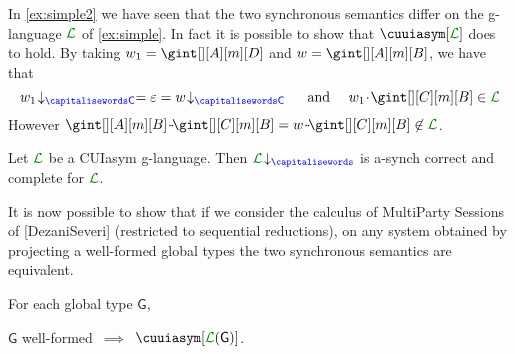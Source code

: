 %
%
% 
% 
%

\begin{example}
In \cref{ex:simple2} we have seen that the two synchronous semantics differ on the g-language 
$\clang$ of \cref{ex:simple}.
In fact it is possible to show that $\cuuiasym[{\clang}]$ does to hold.
By taking $\acword_1=\gint[][A][m][D]$ and $\acword=\gint[][A][m][B]$, we have that
$$\proj{\acword_1}{C}=\emptyword = \proj{\acword}{C} \quad\text{ and }\quad \acword_1\cat\gint[][C][m][B]\in\clang$$
However $\gint[][A][m][B]\cat\cat\gint[][C][m][B]= \acword\cat\cat\gint[][C][m][B]\not\in\clang$.
\finex
\end{example}


\begin{corollary}
Let $\clang$ be a CUIasym g-language. Then $\proj{\clang}{}$ is a-synch correct and complete for $\clang$.
\end{corollary}


It is now possible to show that if we consider the calculus of MultiParty Sessions of [DezaniSeveri]
(restricted to sequential reductions), on any system obtained by projecting a well-formed 
global types the two synchronous semantics are equivalent.


\begin{proposition}
For each global type ${\mathsf G}$,\\
\centerline{${\mathsf G}$ well-formed\ $\implies$\ $\cuuiasym[{\clang({\mathsf G})}]$.}
\end{proposition}

